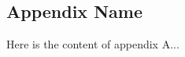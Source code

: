 \appendix
\renewcommand{\thesection}{\Alph{section}}
\setcounter{section}{0}

\begin{appendices}
    \section{Appendix Name}
    Here is the content of appendix A...
\end{appendices}
